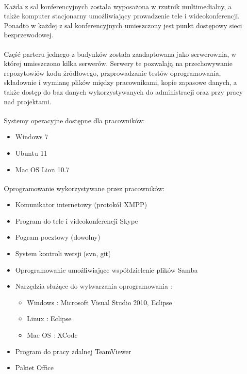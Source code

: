 \paragraph{}
Każda z sal konferencyjnych została wyposażona w rzutnik multimedialny, a także komputer stacjonarny umożliwiający prowadzenie tele i wideokonferencji.
Ponadto w każdej z sal konferencyjnych umieszczony jest punkt dostępowy sieci bezprzewodowej.

\paragraph{}
Część parteru jednego z budynków została zaadaptowana jako serwerownia, w której umieszczono kilka serwerów. Serwery te pozwalają na przechowywanie repozytowiów kodu źródłowego, przprowadzanie testów oprogramowania, składownie i wymianę plików między pracownikami, kopie zapasowe danych, a także dostęp do baz danych wykorzystywanych do administracji oraz przy pracy nad projektami.

\paragraph{}
Systemy operacyjne dostępne dla pracowników:
\begin{itemize}
  \item Windows 7
  \item Ubuntu 11
  \item Mac OS Lion 10.7
\end{itemize}

\paragraph{}
Oprogramowanie wykorzystywane przez pracowników:
\begin{itemize}
  \item Komunikator internetowy (protokół XMPP)
  \item Program do tele i videokonferencji Skype
  \item Pogram pocztowy (dowolny)
  \item System kontroli wersji (svn, git)
  \item Oprogramowanie umożliwiające współdzielenie plików Samba
  \item Narzędzia służące do wytwarzania oprogramowania :
  \begin{itemize}
	\item Windows : Microsoft Visual Studio 2010, Eclipse
	\item Linux : Eclipse
	\item Mac OS : XCode
  \end{itemize}
  \item Program do pracy zdalnej TeamViewer
 \item Pakiet Office
\end{itemize}






